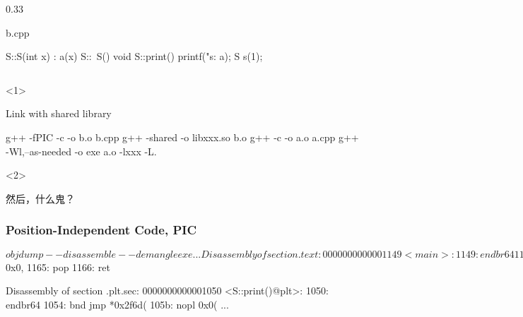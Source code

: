\documentclass[UTF8,lualatex]{ctexbeamer}
\begin{document}
\begin{frame}[fragile,t]
\begin{columns}[t]
\begin{column}{0.33\textwidth}
\begin{block}{b.cpp}
\begin{cppcode}
                S::S(int x) : a(x) {}
                S::~S() {}
                void S::print() {
                  printf("s: %
                    a);
                }
                S s(1);
                \end{cppcode}
            \end{block}
        \end{column}
    \end{columns}
    \begin{onlyenv}<1>
        \begin{block}{Link with shared library}
            \begin{bashcode}
                g++ -fPIC -c -o b.o b.cpp
                g++ -shared -o libxxx.so b.o
                g++ -c -o a.o a.cpp
                g++ -Wl,--as-needed -o exe a.o -lxxx -L.
            \end{bashcode}
        \end{block}
    \end{onlyenv}
    \begin{onlyenv}<2>
        \begin{block}{然后，什么鬼？}
        \end{block}
    \end{onlyenv}
\end{frame}


\begin{frame}[fragile]
    \frametitle{Position-Independent Code, PIC}
    \scriptsize
    \begin{consolecode}
        $ objdump --disassemble --demangle exe
        ...
        Disassembly of section .text:
        0000000000001149 <main>:
            1149: endbr64
            114d: push   %
            114e: mov    %
            1151: mov    0x2e90(%
            1158: mov    %
            115b: call   1050 <S::print()@plt>
            1160: mov    $0x0,%
            1165: pop    %
            1166: ret

        Disassembly of section .plt.sec:
        0000000000001050 <S::print()@plt>:
            1050: endbr64
            1054: bnd jmp *0x2f6d(%
            105b: nopl   0x0(%
        ...
    \end{consolecode}
\end{frame}
\end{document}
